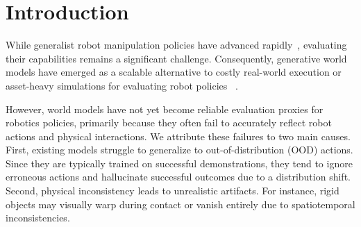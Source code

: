 \usepackage{xspace}
\usepackage{enumitem}
\usepackage[linesnumbered,ruled,vlined]{algorithm2e}
\usepackage{amsmath}
\usepackage{amssymb}
\newcommand{\ours}{\textbf{\texttt{ECHO}}\xspace}
\newcommand{\ar}{\textbf{\texttt{ECHO$_{\text{AR}}$}}\xspace}
\newcommand{\base}{\textbf{\texttt{ECHO$_{\text{Base}}$}}\xspace}
\newcommand{\oursblkeight}{\textbf{\texttt{ECHO}}$_{\text{blk8}}$\xspace}
\newcommand{\oursblkfour}{\textbf{\texttt{ECHO}}$_{\text{blk4}}$\xspace}
\newcommand{\XJ}[1]{\textcolor{red}{[XJ: #1]}}
\newcommand{\ytq}[1]{\textcolor{green}{[ytq: #1]}}
\newcommand{\keywords}[1]{\par\medskip\noindent\textbf{Keywords:}\space\def\and{, }#1}

\section{Introduction}
While generalist robot manipulation policies have advanced rapidly~\citep{[pi0, rt-2, kim24openvla, hu2023look, liu2025hybridvla, intelligence2025pi_, kim2025openvlaoft, team2025gemini, bjorck2025gr00t, zhao2025cot-vla, zhao2025vlas, zhen20243d}, evaluating their capabilities remains a significant challenge. 
Consequently, generative world models have emerged as a scalable alternative to costly real-world execution or asset-heavy simulations for evaluating robot policies
~\cite{li2025worldeval,guo2025ctrl,quevedo2506worldgym,team2025evaluating,ho20251x,huang2025enerverse,jiang2025enerverse,tseng2025scalable}.

However, world models have not yet become reliable evaluation proxies for robotics policies, primarily because they often fail to accurately reflect robot actions and physical interactions. We attribute these failures to two main causes. First, existing models struggle to generalize to out-of-distribution (OOD) actions. Since they are typically trained on successful demonstrations, they tend to ignore erroneous actions and hallucinate successful outcomes due to a distribution shift. Second, physical inconsistency leads to unrealistic artifacts. For instance, rigid objects may visually warp during contact or vanish entirely due to spatiotemporal inconsistencies.





